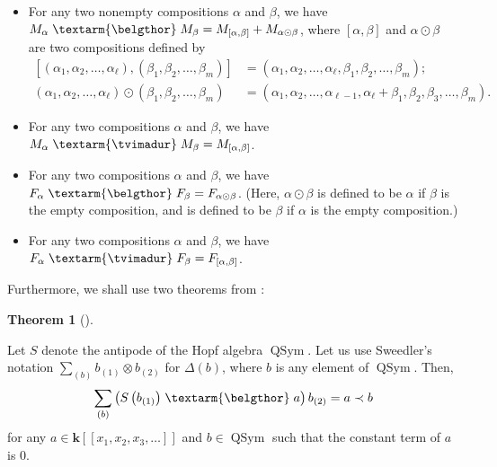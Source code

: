 \documentclass[numbers=enddot,12pt,final,onecolumn,notitlepage]{scrartcl}%
\theoremstyle{definition}
\newtheorem{theo}{Theorem}[section]
\newenvironment{theorem}[1][]
{\begin{theo}[#1]\begin{leftbar}}
{\end{leftbar}\end{theo}}
\newenvironment{verlong}{}{}
\newcommand{\tvi}{\left. \textarm{\tvimadur} \right.}
\newcommand{\bel}{\left. \textarm{\belgthor} \right.}
\let\sumnonlimits\sum
\renewcommand{\sum}{\sumnonlimits\limits}
\begin{document}
\begin{verlong}
\begin{itemize}
\item For any two nonempty compositions $\alpha$ and $\beta$, we have
$M_{\alpha}\bel  M_{\beta}=M_{\left[  \alpha,\beta\right]  }+M_{\alpha
\odot\beta}$, where $\left[  \alpha,\beta\right]  $ and $\alpha\odot\beta$ are
two compositions defined by%
\begin{align*}
\left[  \left(  \alpha_{1},\alpha_{2},\ldots,\alpha_{\ell}\right)  ,\left(
\beta_{1},\beta_{2},\ldots,\beta_{m}\right)  \right]   &  =\left(  \alpha
_{1},\alpha_{2},\ldots,\alpha_{\ell},\beta_{1},\beta_{2},\ldots,\beta
_{m}\right)  ;\\
\left(  \alpha_{1},\alpha_{2},\ldots,\alpha_{\ell}\right)  \odot\left(
\beta_{1},\beta_{2},\ldots,\beta_{m}\right)   &  =\left(  \alpha_{1}%
,\alpha_{2},\ldots,\alpha_{\ell-1},\alpha_{\ell}+\beta_{1},\beta_{2},\beta
_{3},\ldots,\beta_{m}\right)  .
\end{align*}


\item For any two compositions $\alpha$ and $\beta$, we have $M_{\alpha
}\tvi  M_{\beta}=M_{\left[  \alpha,\beta\right]  }$.

\item For any two compositions $\alpha$ and $\beta$, we have $F_{\alpha
}\bel  F_{\beta}=F_{\alpha\odot\beta}$. (Here, $\alpha\odot\beta$ is defined
to be $\alpha$ if $\beta$ is the empty composition, and is defined to be
$\beta$ if $\alpha$ is the empty composition.)

\item For any two compositions $\alpha$ and $\beta$, we have $F_{\alpha
}\tvi  F_{\beta}=F_{\left[  \alpha,\beta\right]  }$.
\end{itemize}

Furthermore, we shall use two theorems from \cite[detailed version, Section
3]{dimcr}:

\begin{theorem}
\label{thm.beldend}Let $S$ denote the antipode of the Hopf algebra
$\operatorname*{QSym}$. Let us use Sweedler's notation $\sum_{\left(
b\right)  }b_{\left(  1\right)  }\otimes b_{\left(  2\right)  }$ for
$\Delta\left(  b\right)  $, where $b$ is any element of $\operatorname*{QSym}%
$. Then,%
\[
\sum_{\left(  b\right)  }\left(  S\left(  b_{\left(  1\right)  }\right)
\bel  a\right)  b_{\left(  2\right)  }=a\left.  \prec\right.  b
\]
for any $a\in\mathbf{k}\left[  \left[  x_{1},x_{2},x_{3},\ldots\right]
\right]  $ and $b\in\operatorname*{QSym}$ such that the constant term
of $a$ is $0$.
\end{theorem}


\end{verlong}
\end{document}
